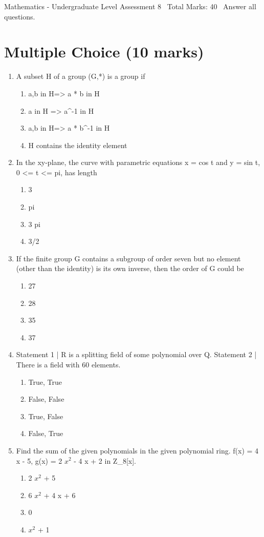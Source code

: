 \documentclass[12pt]{article}
\begin{document}
\begin{center}
Mathematics - Undergraduate Level Assessment 8 \
Total Marks: 40 \
Answer all questions.
\end{center}

\section*{Multiple Choice (10 marks)}
\begin{enumerate}[label=\arabic*.]
\item A subset H of a group (G,*) is a group if
\begin{enumerate}[label=(\alph*)]
    \item a,b in H=\textgreater{} a * b in H
    \item a in H =\textgreater{} a^-1 in H
    \item a,b in H=\textgreater{} a * b^-1 in H
    \item H contains the identity element
\end{enumerate}
\item In the xy-plane, the curve with parametric equations x = cos t and y = sin t, 0 \textless{}= t \textless{}= pi, has length
\begin{enumerate}[label=(\alph*)]
    \item 3
    \item pi
    \item 3 pi
    \item 3/2
\end{enumerate}
\item If the finite group G contains a subgroup of order seven but no element (other than the identity) is its own inverse, then the order of G could be
\begin{enumerate}[label=(\alph*)]
    \item 27
    \item 28
    \item 35
    \item 37
\end{enumerate}
\item Statement 1 | R is a splitting field of some polynomial over Q. Statement 2 | There is a field with 60 elements.
\begin{enumerate}[label=(\alph*)]
    \item True, True
    \item False, False
    \item True, False
    \item False, True
\end{enumerate}
\item Find the sum of the given polynomials in the given polynomial ring. f(x) = 4 x - 5, g(x) = 2 $x^2$ - 4 x + 2 in Z\_8[x].
\begin{enumerate}[label=(\alph*)]
    \item 2 $x^2$ + 5
    \item 6 $x^2$ + 4 x + 6
    \item 0
    \item $x^2$ + 1
\end{enumerate}
\end{enumerate}
\end{document}
